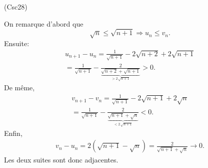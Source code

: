 \begin{tiny}(Csc28)\end{tiny}
On remarque d'abord que 
\[
 \sqrt{n} \leq \sqrt{n+1} \Rightarrow u_n \leq v_n.
\]
Ensuite:
\begin{multline*}
 u_{n+1} - u_n
 = \frac{1}{\sqrt{n+1}} -2\sqrt{n+2} + 2\sqrt{n+1}\\
 = \frac{1}{\sqrt{n+1}} - \frac{2}{\underset{> 2\, \sqrt{n+1}}{\underbrace{\sqrt{n+2} + \sqrt{n+1}}}}
 > 0 .
\end{multline*}
De même,
\begin{multline*}
 v_{n+1} - v_n
 = \frac{1}{\sqrt{n+1}} -2\sqrt{n+1} + 2\sqrt{n}\\
 = \frac{1}{\sqrt{n+1}} - \frac{2}{\underset{< 2\, \sqrt{n+1}}{\underbrace{\sqrt{n+1} + \sqrt{n}}}}
 < 0 .
\end{multline*}
Enfin,
\begin{multline*}
 v_n - u_n = 2\left( \sqrt{n+1} - \sqrt{n}\right)
 = \frac{2}{\sqrt{n+1} + \sqrt{n}} \rightarrow 0.
\end{multline*}
Les deux suites sont donc adjacentes.